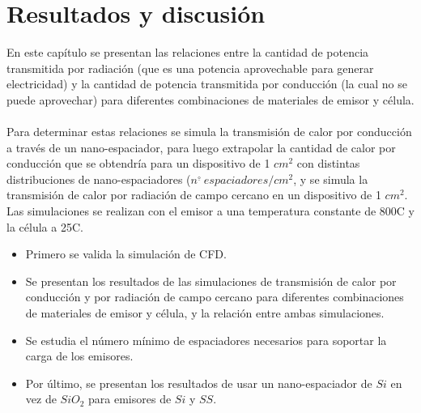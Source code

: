 \chapter{Resultados y discusión}
En este capítulo se presentan las relaciones entre la cantidad de potencia transmitida por radiación (que es una potencia aprovechable para generar electricidad) y la cantidad de potencia transmitida por conducción (la cual no se puede aprovechar) para diferentes combinaciones de materiales de emisor y célula.\\\\
Para determinar estas relaciones se simula la transmisión de calor por conducción a través de un nano-espaciador, para luego extrapolar la cantidad de calor por conducción que se obtendría para un dispositivo de 1 $cm^2$ con distintas distribuciones de nano-espaciadores ($n^{\underline{\circ}}\ espaciadores/cm^2$, y se simula la transmisión de calor por radiación de campo cercano en un dispositivo de 1 $cm^2$. Las simulaciones se realizan con el emisor a una temperatura constante de 800\textdegree C y la célula a 25\textdegree C.
\begin{itemize}
	\item Primero se valida la simulación de CFD.
	\item Se presentan los resultados de las simulaciones de transmisión de calor por conducción y por radiación de campo cercano para diferentes combinaciones de materiales de emisor y célula, y la relación entre ambas simulaciones.
	\item Se estudia el número mínimo de espaciadores necesarios para soportar la carga de los emisores.
	\item Por último, se presentan los resultados de usar un nano-espaciador de $Si$ en vez de $SiO_2$ para emisores de $Si$ y $SS$.
\end{itemize}
